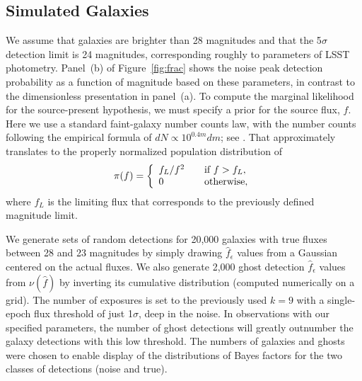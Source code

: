 \documentclass[twocolumn]{emulateapj}
\newcommand{\eind}{\epsilon}  %
\newcommand{\flux}{f}
\newcommand{\fest}{\hat{\flux}}  %
\newcommand{\npd}{\nu}  %
\begin{document}
\subsection{Simulated Galaxies}
\noindent
We assume that galaxies are brighter than 28 magnitudes and that the 5$\sigma$ detection limit is 24 magnitudes, corresponding roughly to parameters of LSST photometry.
%
Panel~(b) of Figure~\ref{fig:frac} shows the noise peak detection probability as a function of magnitude based on these parameters, in contrast to the dimensionless presentation in panel~(a).
%
To compute the marginal likelihood for the source-present hypothesis, we must specify a prior for the source flux, $\flux$.
Here we use a standard faint-galaxy number counts law,
with the number counts following the empirical formula of 
\mbox{$dN\!\propto\!10^{0.4m}dm$}; see \cite{MT00-NumCounts}. 
That approximately translates to the properly normalized population distribution of
%
\begin{equation} 
\label{eq:ref3}
\pi(f) = \left\{\begin{array}{l l}
           f_L/f^2  & \quad \mbox{if\ $f > f_L$},\\
           0 & \quad \mbox{otherwise},
           \\ \end{array} \right.
\end{equation}
%
where $f_L$ is the limiting flux that corresponds to the previously defined magnitude limit.

We generate sets of random detections for 20,000 galaxies with true fluxes between 28 and 23 magnitudes by simply drawing $\fest_\eind$ values from a Gaussian centered on the actual fluxes.
%
We also generate 2,000 ghost detection $\fest_\eind$ values from $\npd(\fest)$ by inverting its cumulative distribution (computed numerically on a grid).
%
The number of exposures is set to the previously used $k=9$ with a single-epoch flux threshold of just 1$\sigma$, deep in the noise.
In observations with our specified parameters, the number of ghost detections will greatly outnumber the galaxy detections with this low threshold.
The numbers of galaxies and ghosts were chosen to enable display of the distributions of Bayes factors for the two classes of detections (noise and true).
\end{document}
